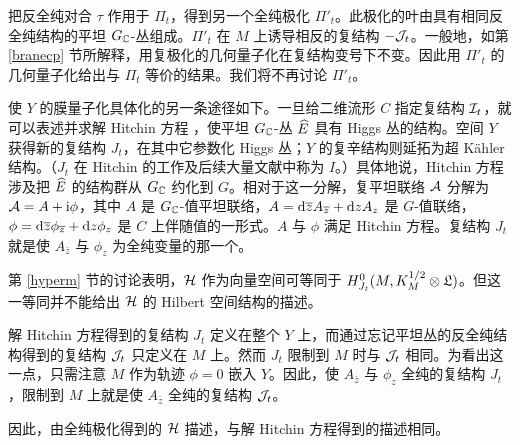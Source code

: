 把反全纯对合 $\tau$ 作用于 $\varPi_t$，得到另一个全纯极化 $\varPi'_t$。此极化的叶由具有相同反全纯结构的平坦 $G_{\mathbb C}$-丛组成。$\varPi'_t$ 在 $M$ 上诱导相反的复结构 $-{\mathcal J}_t$。一般地，如第 \ref{branecp} 节所解释，用复极化的几何量子化在复结构变号下不变。因此用 $\varPi'_t$ 的几何量子化给出与 $\varPi_t$ 等价的结果。我们将不再讨论 $\varPi'_t$。

使 $Y$ 的膜量子化具体化的另一条途径如下。一旦给二维流形 $C$ 指定复结构 ${\mathcal I}_t$，就可以表述并求解 Hitchin 方程 \cite{Hitchin}，使平坦 $G_{\mathbb C}$-丛 $\widehat E$ 具有 Higgs 丛的结构。空间 $Y$ 获得新的复结构 $J_t$，在其中它参数化 Higgs 丛；$Y$ 的复辛结构则延拓为超 Kähler 结构。（$J_t$ 在 Hitchin 的工作及后续大量文献中称为 $I$。）具体地说，Hitchin 方程涉及把 $\widehat E$ 的结构群从 $G_{\mathbb C}$ 约化到 $G$。相对于这一分解，复平坦联络 ${\mathcal A}$ 分解为
${\mathcal A}=A+{\mathrm i}\phi$，其中 $A$ 是 $G_{\mathbb C}$-值平坦联络，$A={\mathrm d}\overline zA_{\overline z}+{\mathrm d} zA_z$ 是 $G$-值联络，$\phi={\mathrm d}\overline z\phi_{\overline z}+{\mathrm d} z\phi_z$ 是 $C$ 上伴随值的一形式。$A$ 与 $\phi$ 满足 Hitchin 方程。复结构 $J_t$ 就是使 $A_{\bar z}$ 与 $\phi_z$ 为全纯变量的那一个。

第 \ref{hyperm} 节的讨论表明，${\mathcal H}$ 作为向量空间可等同于 $H^0_{J_t}(M,K_M^{1/2}\otimes{\mathfrak L})$。但这一等同并不能给出 ${\mathcal H}$ 的 Hilbert 空间结构的描述。

解 Hitchin 方程得到的复结构 $J_t$ 定义在整个 $Y$ 上，而通过忘记平坦丛的反全纯结构得到的复结构 ${\mathcal J}_t$ 只定义在 $M$ 上。然而 $J_t$ 限制到 $M$ 时与 ${\mathcal J}_t$ 相同。为看出这一点，只需注意 $M$ 作为轨迹 $\phi=0$ 嵌入 $Y$。因此，使 $A_{\bar z}$ 与 $\phi_z$ 全纯的复结构 $J_t$，限制到 $M$ 上就是使 $A_{\bar z}$ 全纯的复结构 ${\mathcal J}_t$。

因此，由全纯极化得到的 ${\mathcal H}$ 描述，与解 Hitchin 方程得到的描述相同。

